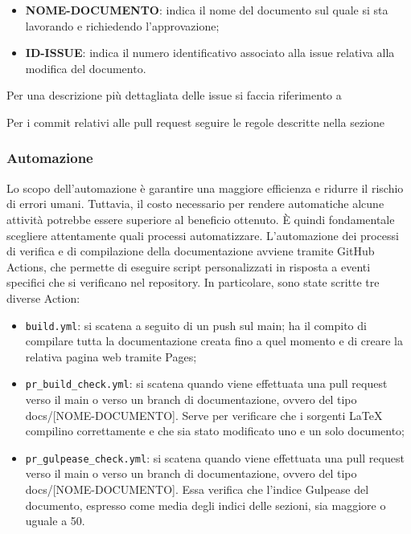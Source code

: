 \begin{itemize}
      \item \textbf{NOME-DOCUMENTO}: indica il nome del documento sul quale si sta lavorando e richiedendo l'approvazione;
      \item \textbf{ID-ISSUE}: indica il numero identificativo associato alla issue relativa alla modifica del documento.
\end{itemize}

Per una descrizione più dettagliata delle issue si faccia riferimento a

Per i commit relativi alle pull request seguire le regole descritte nella
sezione 

\subsubsection{Automazione}
Lo scopo dell'automazione è garantire una maggiore efficienza e ridurre il
rischio di errori umani. Tuttavia, il costo necessario per rendere automatiche
alcune attività potrebbe essere superiore al beneficio ottenuto. È quindi
fondamentale scegliere attentamente quali processi automatizzare.
L'automazione dei processi di verifica e di compilazione della documentazione
avviene tramite GitHub Actions, che permette di eseguire script personalizzati
in risposta a eventi specifici che si verificano nel repository. In
particolare, sono state scritte tre diverse Action:
\begin{itemize}
      \item \texttt{build.yml}: si scatena a seguito di un push sul main; ha il compito di compilare
            tutta la documentazione creata fino a quel momento e di creare la relativa pagina web tramite Pages;
      \item \texttt{pr\_build\_check.yml}: si scatena quando viene effettuata una pull request verso il main o verso
            un branch di documentazione, ovvero del tipo docs/[NOME-DOCUMENTO]. Serve per verificare che
            i sorgenti LaTeX compilino correttamente e che sia stato modificato uno e un solo documento;
      \item \texttt{pr\_gulpease\_check.yml}: si scatena quando viene effettuata una pull request verso il main o verso
            un branch di documentazione, ovvero del tipo docs/[NOME-DOCUMENTO]. Essa verifica che
            l'indice Gulpease del documento, espresso come media degli indici delle sezioni, sia maggiore o uguale a 50.
\end{itemize}
